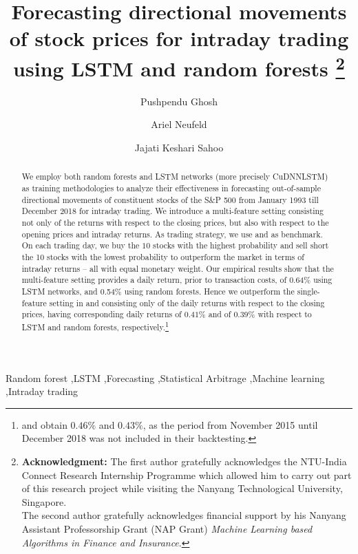 \documentclass[review]{elsarticle}
\begin{document}
\begin{frontmatter}

\title{Forecasting directional movements of stock prices for intraday trading\\ using LSTM and random forests
	\footnote{
		\noindent
		\textbf{Acknowledgment:} The first author gratefully acknowledges the NTU-India Connect Research Internship Programme which allowed him to carry out part of this research project while visiting the Nanyang Technological University, Singapore.\\
		The second author gratefully acknowledges financial support by his Nanyang Assistant Professorship Grant (NAP Grant) \emph{Machine Learning based Algorithms in Finance and Insurance}.}
	}


\author[add1]{Pushpendu Ghosh}
\author[add2]{Ariel Neufeld}
\author[add3]{Jajati Keshari Sahoo}


\address[add1]{Department of Computer Science $\&$ Information Systems, BITS Pilani K.K.Birla Goa campus, India}
\address[add2]{Division of Mathematical Sciences, Nanyang Technological University, Singapore}
\address[add3]{Department of Mathematics, BITS Pilani K.K.Birla Goa campus, India}

\begin{abstract}
We employ both random forests  and LSTM networks (more precisely CuDNNLSTM)  as training methodologies to analyze their effectiveness in forecasting out-of-sample directional movements of constituent stocks of the S\&P 500 from January 1993 till December 2018 for intraday trading.
We introduce a multi-feature setting consisting not only of the returns with respect to the closing prices, but also with respect to the opening prices and intraday returns. 
As trading strategy, we use  \cite{krauss17} and \cite{krauss18} as benchmark. On each trading day, we buy the $10$ stocks with the highest probability and sell short the 10 stocks with the lowest probability 
to outperform  the market in terms of intraday returns -- all with equal monetary weight. 
Our empirical results show that the multi-feature setting provides a daily return, prior to transaction costs, of 0.64\% using LSTM networks, and 0.54\% using random forests. Hence we outperform the single-feature setting in \cite{krauss18} and \cite{krauss17}
consisting only of 
the daily returns with respect to the closing prices, having corresponding daily returns of  $0.41\%$ and of $0.39\%$ with respect to LSTM and random forests, respectively.\footnote{\cite{krauss18} and  \cite{krauss17} obtain $0.46\%$ and $0.43\%$, as the period from November 2015 until December 2018 was not included in their backtesting.}


	
\end{abstract}

\begin{keyword}
Random forest \sep LSTM  \sep Forecasting \sep Statistical Arbitrage \sep Machine learning \sep Intraday trading



\end{keyword}
\end{frontmatter}
\end{document}
